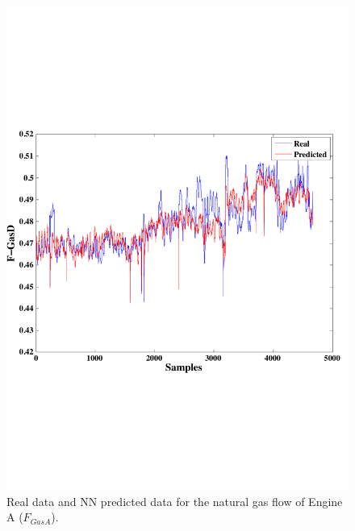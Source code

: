 \begin{figure}
\centering
\includegraphics[width=1\textwidth]{figures/ANNengineD.pdf}
\caption{Real data and NN predicted data for the natural gas flow  of Engine A ($F_{GasA}$).}
\label{FengineA}
\end{figure}

